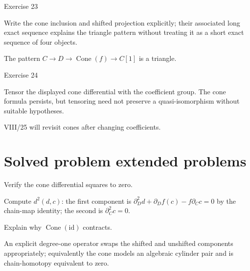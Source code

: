 \begin{exercise}\label{exr:viii24-23}
Exercise 23
\end{exercise}
\begin{hint}
Write the cone inclusion and shifted projection explicitly; their associated long exact sequence explains the triangle pattern without treating it as a short exact sequence of four objects.
\end{hint}
\begin{solution}
The pattern \(C\to D\to\operatorname{Cone}(f)\to C[1]\) is a triangle.
\end{solution}

\begin{exercise}\label{exr:viii24-24}
Exercise 24
\end{exercise}
\begin{hint}
Tensor the displayed cone differential with the coefficient group. The cone formula persists, but tensoring need not preserve a quasi-isomorphism without suitable hypotheses.
\end{hint}
\begin{solution}
VIII/25 will revisit cones after changing coefficients.
\end{solution}


\section{Solved problem extended problems}

\begin{problem}\label{prob:viii24-01}
Verify the cone differential squares to zero.
\end{problem}
\begin{solution}
Compute \(d^2(d,c)\): the first component is \(\partial_D^2d+\partial_Df(c)-f\partial_Cc=0\) by the chain-map identity; the second is \(\partial_C^2c=0\).
\end{solution}

\begin{problem}\label{prob:viii24-02}
Explain why \(\operatorname{Cone}(\mathrm{id})\) contracts.
\end{problem}
\begin{solution}
An explicit degree-one operator swaps the shifted and unshifted components appropriately; equivalently the cone models an algebraic cylinder pair and is chain-homotopy equivalent to zero.
\end{solution}

